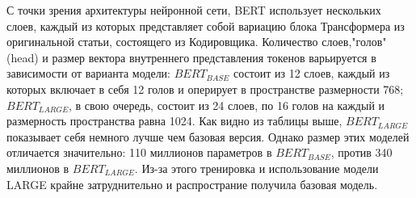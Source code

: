\par С точки зрения архитектуры нейронной сети, BERT использует нескольких слоев, каждый из которых представляет собой вариацию блока Трансформера из оригинальной статьи, состоящего из Кодировщика. Количество слоев,"голов" (head) и размер вектора внутреннего представления токенов варьируется в зависимости от варианта модели: $BERT_{BASE}$ состоит из 12 слоев, каждый из которых включает в себя 12 голов и оперирует в пространстве размерности 768; $BERT_{LARGE}$, в свою очередь, состоит из 24 слоев, по 16 голов на каждый и размерность пространства равна 1024. Как видно из таблицы выше, $BERT_{LARGE}$ показывает себя немного лучше чем базовая версия. Однако размер этих моделей отличается значительно: 110 миллионов параметров в $BERT_{BASE}$, против 340 миллионов в $BERT_{LARGE}$. Из-за этого тренировка и использование модели LARGE крайне затруднительно и распространие получила базовая модель.


\clearpage

